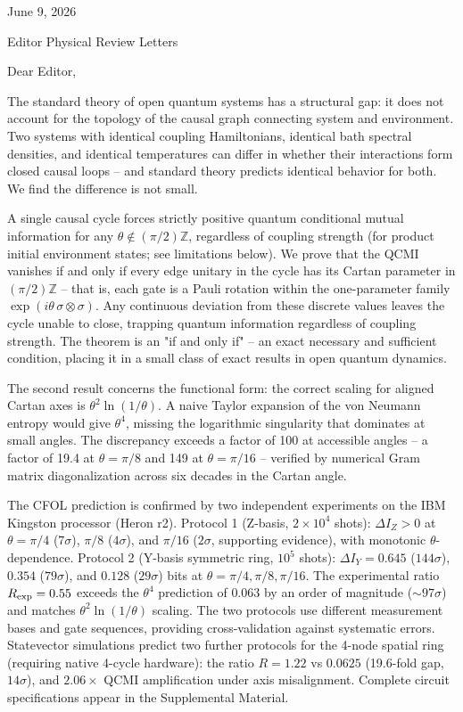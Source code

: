 June 9, 2026

Editor
Physical Review Letters

Dear Editor,

The standard theory of open quantum systems has a structural gap: it does not account for the topology of the causal graph connecting system and environment. Two systems with identical coupling Hamiltonians, identical bath spectral densities, and identical temperatures can differ in whether their interactions form closed causal loops -- and standard theory predicts identical behavior for both. We find the difference is not small.

A single causal cycle forces strictly positive quantum conditional mutual information for any $\theta \notin (\pi/2)\mathbb{Z}$, regardless of coupling strength (for product initial environment states; see limitations below). We prove that the QCMI vanishes if and only if every edge unitary in the cycle has its Cartan parameter in $(\pi/2)\mathbb{Z}$ -- that is, each gate is a Pauli rotation within the one-parameter family $\exp(i\theta\,\sigma\otimes\sigma)$. Any continuous deviation from these discrete values leaves the cycle unable to close, trapping quantum information regardless of coupling strength. The theorem is an "if and only if" -- an exact necessary and sufficient condition, placing it in a small class of exact results in open quantum dynamics.

The second result concerns the functional form: the correct scaling for aligned Cartan axes is $\theta^2\ln(1/\theta)$. A naive Taylor expansion of the von Neumann entropy would give $\theta^4$, missing the logarithmic singularity that dominates at small angles. The discrepancy exceeds a factor of 100 at accessible angles -- a factor of 19.4 at $\theta=\pi/8$ and 149 at $\theta=\pi/16$ -- verified by numerical Gram matrix diagonalization across six decades in the Cartan angle.

The CFOL prediction is confirmed by two independent experiments on the IBM Kingston processor (Heron r2). Protocol 1 (Z-basis, $2\times10^4$ shots): $\Delta I_Z>0$ at $\theta=\pi/4$ ($7\sigma$), $\pi/8$ ($4\sigma$), and $\pi/16$ ($2\sigma$, supporting evidence), with monotonic $\theta$-dependence. Protocol 2 (Y-basis symmetric ring, $10^5$ shots): $\Delta I_Y = 0.645$ ($144\sigma$), $0.354$ ($79\sigma$), and $0.128$ ($29\sigma$) bits at $\theta=\pi/4,\pi/8,\pi/16$. The experimental ratio $R_{\rm exp}=0.55$ exceeds the $\theta^4$ prediction of $0.063$ by an order of magnitude (${\sim}97\sigma$) and matches $\theta^2\ln(1/\theta)$ scaling. The two protocols use different measurement bases and gate sequences, providing cross-validation against systematic errors. Statevector simulations predict two further protocols for the 4-node spatial ring (requiring native 4-cycle hardware): the ratio $R=1.22$ vs $0.0625$ (19.6-fold gap, $14\sigma$), and $2.06\times$ QCMI amplification under axis misalignment. Complete circuit specifications appear in the Supplemental Material.

